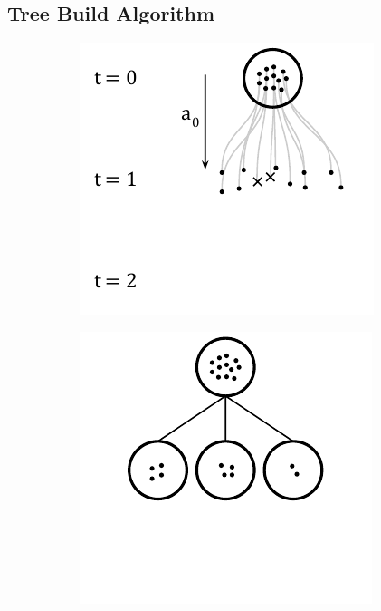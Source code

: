 \documentclass[letterpaper]{article} %
\begin{document}
\subsection{Tree Build Algorithm}
\begin{figure}[t]
    \centering
    \begin{subfigure}[b]{0.32\textwidth}
        \centering
        \includegraphics[width=\textwidth]{figs/build_1.pdf}
        \caption{}\label{fig: build 1}
    \end{subfigure}
    \begin{subfigure}[b]{0.32\textwidth}
        \centering
        \includegraphics[width=\textwidth]{figs/build_2.pdf}

\end{subfigure}
\end{figure}
\end{document}
